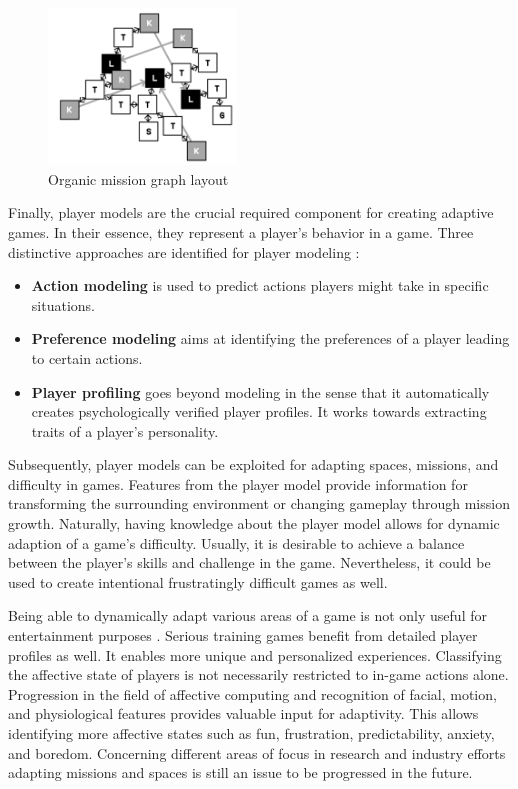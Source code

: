 \begin{figure}[H]
    \centering
    \includegraphics[width=5cm]{assets/organic-mission-layout.png}
    \caption{Organic mission graph layout \protect\cite{Dormans2011}}
    \label{fig:organic-mission-layout}
\end{figure}

Finally, player models are the crucial required component for creating adaptive games.
In their essence, they represent a player's behavior in a game.
Three distinctive approaches are identified for player modeling \cite{Dormans2011}:
\begin{itemize}
    \item \textbf{Action modeling} is used to predict actions players might take in specific situations.
    \item \textbf{Preference modeling} aims at identifying the preferences of a player leading to certain actions.
    \item \textbf{Player profiling} goes beyond modeling in the sense that it automatically creates psychologically verified player profiles. It works towards extracting traits of a player's personality.
\end{itemize}
Subsequently, player models can be exploited for adapting spaces, missions, and difficulty in games.
Features from the player model provide information for transforming the surrounding environment or changing gameplay through mission growth.
Naturally, having knowledge about the player model allows for dynamic adaption of a game's difficulty.
Usually, it is desirable to achieve a balance between the player's skills and challenge in the game.
Nevertheless, it could be used to create intentional frustratingly difficult games as well.

Being able to dynamically adapt various areas of a game is not only useful for entertainment purposes \cite{Lopes2011}.
Serious training games benefit from detailed player profiles as well.
It enables more unique and personalized experiences.
Classifying the affective state of players is not necessarily restricted to in-game actions alone.
Progression in the field of affective computing and recognition of facial, motion, and physiological features provides valuable input for adaptivity.
This allows identifying more affective states such as fun, frustration, predictability, anxiety, and boredom.
Concerning different areas of focus in research and industry efforts adapting missions and spaces is still an issue to be progressed in the future.

